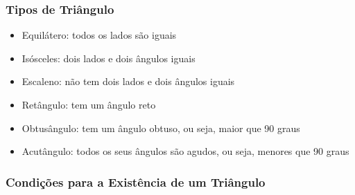 \subsubsection*{Tipos de Triângulo}
\begin{itemize}
\item Equilátero: todos os lados são iguais
\item Isósceles: dois lados e dois ângulos iguais
\item Escaleno: não tem dois lados e dois ângulos iguais
\item Retângulo: tem um ângulo reto
\item Obtusângulo:  tem um ângulo obtuso, ou seja, maior que 90 graus
\item Acutângulo: todos os seus ângulos são agudos, ou seja, menores que 90 graus
\end{itemize}

\subsubsection*{Condições para a Existência de um Triângulo}
